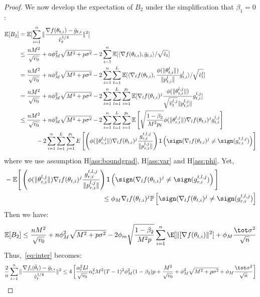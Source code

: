 \documentclass[twoside]{article}
\begin{document}
\begin{proof}
 We now develop the expectation of $B_2$ under the simplification that $\beta_1 = 0$:
 \begin{align}\notag
     \mathbb E[B_2]&=\mathbb E[\sum_{i=1}^n\Vert \frac{\nabla f(\theta_{t,i})-\bar g_{t,i}}{\hat v_t^{1/4}} \Vert^2] \\\notag
     &\leq \frac{nM^2}{\sqrt{v_0}}+n\phi_M^2\sqrt{M^2+p\sigma^2}-2\sum_{i=1}^n\mathbb E[\langle \nabla f(\theta_{t,i}),\bar g_{t,i} \rangle/\sqrt{\hat v_t}]\\\notag
     &=\frac{nM^2}{\sqrt{v_0}}+n\phi_M^2\sqrt{M^2+p\sigma^2}-2\sum_{i=1}^n \sum_{\ell=1}^L \mathbb E[\langle \nabla_\ell f(\theta_{t,i}),\frac{\phi(\|\theta_{t,i}^l \|)}{\| p_{t,i}^l \|}g_{t,i}^l \rangle/\sqrt{\hat v_t^l}]\\\notag
     &=\frac{nM^2}{\sqrt{v_0}}+n\phi_M^2\sqrt{M^2+p\sigma^2}-2\sum_{i=1}^n \sum_{l=1}^L\sum_{i=1}^{p_l} \mathbb E[\nabla_l f(\theta_{t,i})^j\frac{\phi(\|\theta_{t,i}^{l,j} \|)}{\sqrt{\hat v_t^{l,j}}\| p_{t,i}^{l,j} \|}g_{t,i}^{l,j} ]\\\notag
     & \leq \frac{nM^2}{\sqrt{v_0}}+n\phi_M^2\sqrt{M^2+p\sigma^2}-2\sum_{i=1}^n \sum_{l=1}^L\sum_{i=1}^{p_l} \mathbb E \left[ \sqrt{\frac{1-\beta_2}{M^2 p_\ell}}  \phi(\|\theta_{r,i}^{l,j}\|)  \nabla_l f(\theta_{t,i})^j  g_{t,i}^{l,j}\right]\\\notag
     &\hspace{0.4in} -2 \sum_{i = 1}^n \sum_{l=1}^L\sum_{j=1}^{p_l}  E \left[  \left( \phi(\|\theta_{r,i}^{l,j}\|)   \nabla_l f(\theta_{t,i})^j   \frac{g_{r,i}^{t,l,j}}{ \|p_{r,i}^{l,j}\|}\right)\mathsf{1}\left( \sign(  \nabla_l f(\theta_{t,i})^j \neq  \sign( g_{r,i}^{t,l,j}) \right)\right]
 \end{align}
 where we use assumption H\ref{ass:boundgrad}, H\ref{ass:var} and H\ref{ass:phi}. 
 Yet,
 \begin{align*}
 &- \mathbb E \Bigg[  \left( \phi(\|\theta_{r,i}^{l,j}\|)   \nabla_l f(\theta_{t,i})^j   \frac{g_{r,i}^{t,l,j}}{ \|p_{r,i}^{l,j}\|}\right)\mathsf{1}\left( \sign(  \nabla_l f(\theta_{t,i})^j
 \neq  \sign( g_{r,i}^{t,l,j}) \right)\Bigg] \\
 &\hspace{2in} \leq  \phi_M \nabla_l f(\theta_{t,i})^j   \mathbb{P}\left[  \sign(  \nabla_l f(\theta_{t,i})^j \neq  \sign( g_{r,i}^{t,l,j}) \right]
 \end{align*}
 Then we have:
 \begin{align}\notag
     \mathbb E[B_2]\leq  \frac{nM^2}{\sqrt{v_0}}+n\phi_M^2\sqrt{M^2+p\sigma^2}-2 \phi_m \sqrt{\frac{1-\beta_2}{M^2 p}} \sum_{i=1}^n \E[\| [\nabla f(\theta_{t,i}) \|^2] + \phi_M \frac{\tot \sigma^2}{\sqrt{n}}
 \end{align}
 Thus,~\eqref{eq:inter} becomes:
 \begin{align}\notag
     \frac{2}{n}\sum_{i=1}^n\Vert \frac{\nabla f_i(\bar\theta_t)-\bar g_{t,i}}{\hat v_t^{1/4}} \Vert^2 \leq 4 \left[ \frac{\alpha_t^2 Ll}{\sqrt{v_0}} \alpha_r^2 M^2 (T-1)^2 \phi_M^2 (1-\beta_2)p + \frac{M^2}{\sqrt{v_0}}+\phi_M^2\sqrt{M^2+p\sigma^2} + \phi_M \frac{\tot \sigma^2}{\sqrt{n}}\right]
 \end{align}


\end{proof}
\end{document}
